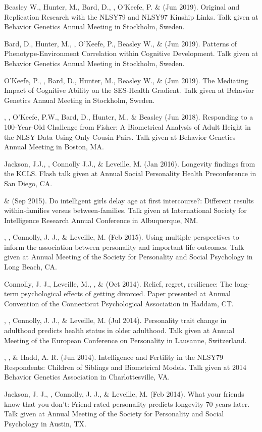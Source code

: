 \begin{etaremune}
%
\item Beasley W., Hunter, M., Bard, D., \meb, O'Keefe, P. \&  \Joe (Jun 2019). Original and Replication Research with the NLSY79 and NLSY97 Kinship Links. Talk given at Behavior Genetics Annual Meeting in Stockholm, Sweden. 
%
\item Bard, D., Hunter, M., \meb, O'Keefe, P., Beasley W.,  \&  \Joe (Jun 2019). Patterns of Phenotype-Environment Correlation within Cognitive Development. Talk given at Behavior Genetics Annual Meeting in Stockholm, Sweden. 
%
\item O'Keefe, P., \meb, Bard, D., Hunter, M.,  Beasley W.,  \&  \Joe (Jun 2019). The Mediating Impact of Cognitive Ability on the SES-Health Gradient. Talk given at Behavior Genetics Annual Meeting in Stockholm, Sweden. 
%
\item\Joe, \meb, O'Keefe, P.W., Bard, D., Hunter, M., \& Beasley (Jun 2018). Responding to a 100-Year-Old Challenge from Fisher: A Biometrical Analysis of Adult Height in the NLSY Data Using Only Cousin Pairs. Talk given at Behavior Genetics Annual Meeting in Boston, MA. 

\item Jackson, J.J., \meb, Connolly J.J., \& Leveille, M. (Jan 2016). Longevity findings from the KCLS. Flash talk given at Annual Social Personality Health Preconference in San Diego, CA. %
%
\item \joe \& \meb (Sep 2015). Do intelligent girls delay age at first intercourse?: Different results within-families versus between-families. Talk given at International Society for Intelligence Research Annual Conference in Albuquerque, NM.

\item \jjj, \meb, Connolly, J. J., \& Leveille, M. (Feb 2015). Using multiple perspectives to inform the association between personality and important life outcomes. Talk given at Annual Meeting of the Society for Personality and Social Psychology in Long Beach, CA.
%
\item Connolly, J. J., Leveille, M., \meb, \& \jjj (Oct 2014). Relief, regret, resilience: The long-term psychological effects of getting divorced. Paper presented at Annual Convention of the Connecticut Psychological Association in Haddam, CT.
%
\item \jjj, \meb, Connolly, J. J., \& Leveille, M. (Jul 2014). Personality trait change in adulthood predicts health status in older adulthood. Talk given at Annual Meeting of the European Conference on Personality in Lausanne, Switzerland.
%
\item \joe, \meb, \& Hadd, A. R. (Jun 2014). Intelligence and Fertility in the NLSY79 Respondents: Children of Siblings and Biometrical Models. Talk given at 2014 Behavior Genetics Association in Charlottesville, VA.

\item Jackson, J. J., \meb, Connolly, J. J., \& Leveille, M. (Feb 2014). What your friends know that you don't: Friend-rated personality predicts longevity 70 years later. Talk given at Annual Meeting of the Society for Personality and Social Psychology in Austin, TX.
\end{etaremune}
